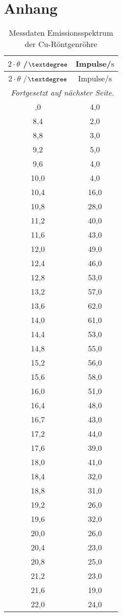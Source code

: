 \section{Anhang}
\begin{longtable}{cc}
\caption{Messdaten Emissionsspektrum der Cu-Röntgenröhre}\\
\hline
$2 \cdot \theta$ /$\textdegree$ &Impulse/$\si{\second}$\\
\hline
\endfirsthead
$2 \cdot \theta$ /$\textdegree$ &Impulse/$\si{\second}$\\
\hline
\endhead
\hline \multicolumn{2}{r}{\textit{Fortgesetzt auf nächster Seite.}} \\
\endfoot
\hline
\endlastfoot
8,0	&4,0\\
8,4	&2,0\\
8,8	&3,0\\
9,2	&5,0\\
9,6	&4,0\\
10,0	&4,0\\
10,4	&16,0\\
10,8	&28,0\\
11,2	&40,0\\
11,6	&43,0\\
12,0	&49,0\\
12,4	&46,0\\
12,8	&53,0\\
13,2	&57,0\\
13,6	&62,0\\
14,0	&61,0\\
14,4	&53,0\\
14,8	&55,0\\
15,2	&56,0\\
15,6	&58,0\\
16,0	&51,0\\
16,4	&48,0\\
16,7	&43,0\\
17,2	&44,0\\
17,6	&39,0\\
18,0	&41,0\\
18,4	&32,0\\
18,8	&31,0\\
19,2	&26,0\\
19,6	&32,0\\
20,0	&26,0\\
20,4	&23,0\\
20,8	&25,0\\
21,2	&23,0\\
21,6	&19,0\\
22,0	&24,0\\

\end{longtable}
